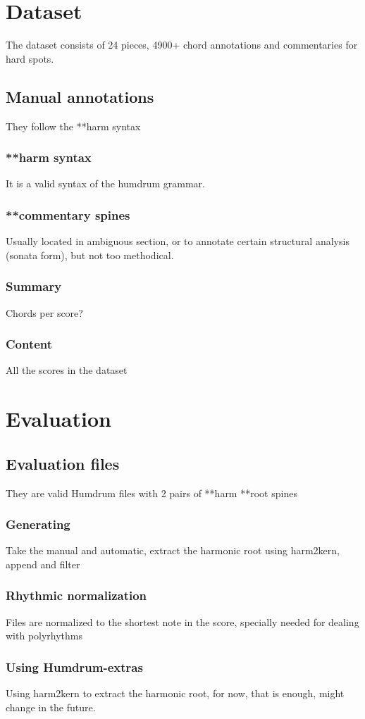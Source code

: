 \section{Dataset}
The dataset consists of 24 pieces, 4900+ chord annotations and commentaries for hard spots.
	\subsection{Manual annotations}
  They follow the **harm syntax
		\subsubsection{**harm syntax}
    It is a valid syntax of the humdrum grammar.
		\subsubsection{**commentary spines}
    Usually located in ambiguous section, or to annotate certain structural analysis (sonata form), but not too methodical.
		\subsubsection{Summary}
    Chords per score?
		\subsubsection{Content}
    All the scores in the dataset
\section{Evaluation}
  \subsection{Evaluation files}
		They are valid Humdrum files with 2 pairs of **harm **root spines
    \subsubsection{Generating}
    Take the manual and automatic, extract the harmonic root using harm2kern, append and filter
    \subsubsection{Rhythmic normalization}
    Files are normalized to the shortest note in the score, specially needed for dealing with polyrhythms
		\subsubsection{Using Humdrum-extras}
    Using harm2kern to extract the harmonic root, for now, that is enough, might change in the future.
